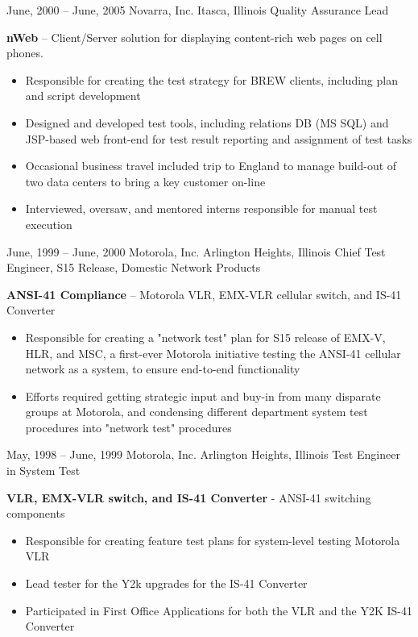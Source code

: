 \documentclass[]{friggeri-cv}
\begin{document}
\begin{entrylist}
     \entryalt
    {June, 2000 -- June, 2005}
    {Novarra, Inc.}
    {Itasca, Illinois}
    {Quality Assurance Lead}
    {\textbf{nWeb} -- Client/Server solution for displaying content-rich web pages on cell phones.
    \begin{itemize}
      \item Responsible for creating the test strategy for BREW clients, including plan and script development
      \item Designed and developed test tools, including relations DB (MS SQL) and JSP-based web front-end for test result reporting and assignment of test tasks
      \item Occasional business travel included trip to England to manage build-out of two data centers to bring a key customer on-line
      \item Interviewed, oversaw, and mentored interns responsible for manual test execution
     \end{itemize}}
     
     \entryalt
     {June, 1999 -- June, 2000}
     {Motorola, Inc.}
     {Arlington Heights, Illinois}
     {Chief Test Engineer, S15 Release, Domestic Network Products}
     {\textbf{ANSI-41 Compliance} -- Motorola VLR, EMX-VLR cellular switch, and IS-41 Converter
     \begin{itemize}
       \item Responsible for creating a "network test" plan for S15 release of EMX-V, HLR, and MSC, a first-ever Motorola initiative testing the ANSI-41 cellular network as a system, to ensure end-to-end functionality
       \item Efforts required getting strategic input and buy-in from many disparate groups at Motorola, and condensing different department system test procedures into "network test" procedures
     \end{itemize}}
       
     \entryalt
     {May, 1998 -- June, 1999}
     {Motorola, Inc.}
     {Arlington Heights, Illinois}
     {Test Engineer in System Test}
     {\textbf{VLR, EMX-VLR switch, and IS-41 Converter} - ANSI-41 switching components
     \begin{itemize}
       \item Responsible for creating feature test plans for system-level testing Motorola VLR
       \item Lead tester for the Y2k upgrades for the IS-41 Converter
       \item Participated in First Office Applications for both the VLR and the Y2K IS-41 Converter
     \end{itemize}}
     
\end{entrylist} 
    
\end{document}
